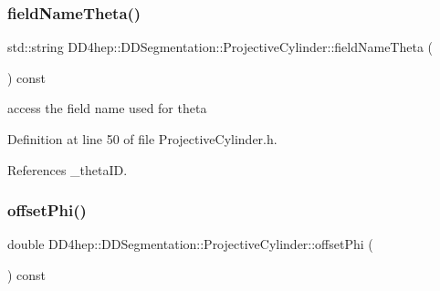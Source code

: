 \hypertarget{class_d_d4hep_1_1_d_d_segmentation_1_1_projective_cylinder_a17e968911533a752193d725dd3c03a99}{}\label{class_d_d4hep_1_1_d_d_segmentation_1_1_projective_cylinder_a17e968911533a752193d725dd3c03a99} 
\subsubsection{\texorpdfstring{field\+Name\+Theta()}{fieldNameTheta()}}
{\footnotesize\ttfamily std\+::string D\+D4hep\+::\+D\+D\+Segmentation\+::\+Projective\+Cylinder\+::field\+Name\+Theta (\begin{DoxyParamCaption}{ }\end{DoxyParamCaption}) const\hspace{0.3cm}{\ttfamily [inline]}}



access the field name used for theta 



Definition at line 50 of file Projective\+Cylinder.\+h.



References \+\_\+theta\+ID.

\hypertarget{class_d_d4hep_1_1_d_d_segmentation_1_1_projective_cylinder_a4e44519136be4b1de822ca771b997f72}{}\label{class_d_d4hep_1_1_d_d_segmentation_1_1_projective_cylinder_a4e44519136be4b1de822ca771b997f72} 
\subsubsection{\texorpdfstring{offset\+Phi()}{offsetPhi()}}
{\footnotesize\ttfamily double D\+D4hep\+::\+D\+D\+Segmentation\+::\+Projective\+Cylinder\+::offset\+Phi (\begin{DoxyParamCaption}{ }\end{DoxyParamCaption}) const\hspace{0.3cm}{\ttfamily [inline]}}



